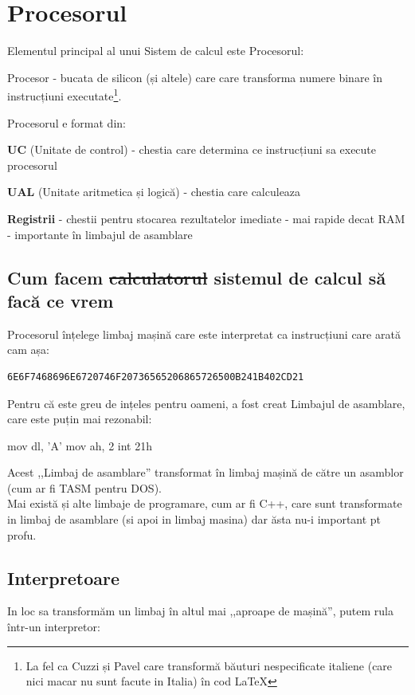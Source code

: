 \documentclass[11pt,a4paper]{article}
\DeclareRobustCommand{\hsout}[1]{\texorpdfstring{\sout{#1}}{#1}}
\begin{document}
\section{Procesorul}
Elementul principal al unui Sistem de calcul este Procesorul:

Procesor - bucata de silicon (și altele) care care transforma numere binare în instrucțiuni executate\footnote{La fel ca Cuzzi și Pavel care transformă băuturi nespecificate italiene (care nici macar nu sunt facute in Italia) în cod LaTeX}.

Procesorul e format din:

\quad\quad \textbf{UC} (Unitate de control) - chestia care determina ce instrucțiuni sa execute procesorul

\quad\quad \textbf{UAL} (Unitate aritmetica și logică) - chestia care calculeaza

\quad\quad \textbf{Registrii} - chestii pentru stocarea rezultatelor imediate - mai rapide decat RAM - importante în limbajul de asamblare 

\subsection*{Cum facem \hsout{calculatorul} sistemul de calcul să facă ce vrem}

Procesorul înțelege limbaj mașină care este interpretat ca instrucțiuni care arată cam așa:
\begin{verbatim}
6E6F7468696E6720746F20736565206865726500B241B402CD21
\end{verbatim}

Pentru că este greu de ințeles pentru oameni, a fost creat Limbajul de asamblare, care este puțin mai rezonabil:
\begin{asm}
mov dl, 'A'
mov ah, 2
int 21h
\end{asm}

Acest ,,Limbaj de asamblare'' transformat în limbaj mașină de către un asamblor (cum ar fi TASM pentru DOS).
\\

Mai există și alte limbaje de programare, cum ar fi C++, care sunt transformate in limbaj de asamblare (si apoi in limbaj masina) dar ăsta nu-i important pt profu.

\subsection*{Interpretoare}


In loc sa transformăm un limbaj în altul mai ,,aproape de mașină'', putem rula într-un interpretor:
\end{document}
